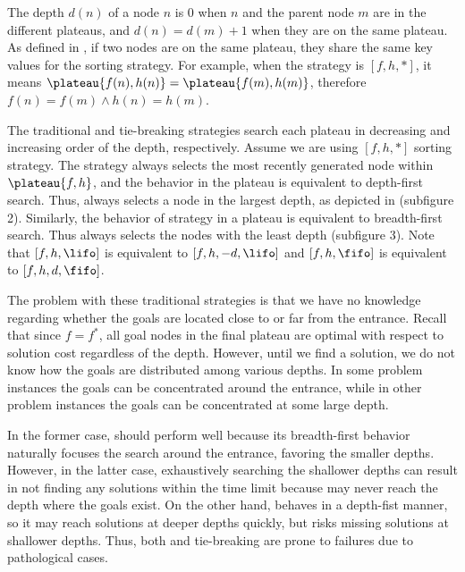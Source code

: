 The depth $d(n)$ of a node $n$ is 0 when $n$ and
the parent node $m$ are in the different plateaus,
and $d(n)=d(m)+1$ when they are on the same plateau.
As defined in , if two nodes are  on the same plateau, 
they share the same key values for the sorting strategy.
For example, when the strategy is $[f,h,*]$,
it means $\plateau{f(n),h(n)}=\plateau{f(m),h(m)}$, therefore
$f(n) = f(m) \land h(n) = h(m)$.

The traditional \lifo and \fifo tie-breaking strategies
search each plateau in decreasing and increasing order of the depth, respectively.
Assume we are using $[f,h,*]$ sorting strategy.
The \lifo strategy always selects the most recently generated node
within $\plateau{f,h}$, and the behavior in the plateau is equivalent to depth-first search.
Thus, \lifo always selects a node in the largest depth,
as depicted in  (subfigure 2).
Similarly, the behavior of \fifo strategy 
in a plateau is equivalent to breadth-first search. Thus \fifo 
always selects the nodes with the least depth (subfigure 3).
Note that  $[f,h,\lifo]$ is equivalent to $[f,h,-d,\lifo]$ and
$[f,h,\fifo]$ is equivalent to $[f,h,d,\fifo]$.

The problem with these traditional strategies is that we have no knowledge
regarding whether the goals are located close to or far from the entrance. Recall
that since $f=f^*$, all goal nodes in the final plateau are optimal with respect to solution cost
regardless of the depth.
However, until we find a
solution, we do not know how the goals are distributed among various
depths. In some problem instances the goals can be concentrated around
the entrance, while in other problem instances the goals can be
concentrated at some large depth. %

In the former case, \fifo
should perform well because its breadth-first behavior naturally
focuses the search around the entrance, favoring the smaller depths.
However, in the latter case, exhaustively searching
the shallower depths can result in not finding any solutions within
the time limit because \fifo may never reach the depth where the goals
exist.  On the other hand, \lifo behaves in a depth-fist manner, so it
may reach solutions at deeper depths quickly, but risks missing
solutions at shallower depths.  Thus, both \fifo and \lifo tie-breaking
are prone to failures due to pathological cases.


